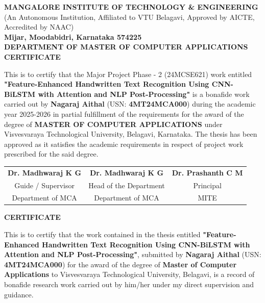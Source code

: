 \newpage

\begin{center}
    \textbf{MANGALORE INSTITUTE OF TECHNOLOGY \& ENGINEERING} \\
    {\small (An Autonomous Institution, Affiliated to VTU Belagavi, Approved by AICTE, Accredited by NAAC)} \\
    \textbf{Mijar, Moodabidri, Karnataka 574225} \\
    \vspace{0.5cm}
    \textbf{DEPARTMENT OF MASTER OF COMPUTER APPLICATIONS} \\
    \vspace{1.5cm}
    \Large{\textbf{CERTIFICATE}} \\
    \vspace{1.0cm}
\end{center}
This is to certify that the Major Project Phase - 2 (24MCSE621) work entitled \textbf{"Feature-Enhanced Handwritten Text Recognition Using CNN-BiLSTM with Attention and NLP Post-Processing"} is a bonafide work carried out by \textbf{Nagaraj Aithal} (USN: \textbf{4MT24MCA000}) during the academic year 2025-2026 in partial fulfillment of the requirements for the award of the degree of \textbf{MASTER OF COMPUTER APPLICATIONS} under Visvesvaraya Technological University, Belagavi, Karnataka. The thesis has been approved as it satisfies the academic requirements in respect of project work prescribed for the said degree.
\vspace{3cm}
\begin{table}[h!]
    \centering
    \begin{tabular}{ccc}
        \textbf{Dr. Madhwaraj K G} & \textbf{Dr. Madhwaraj K G} & \textbf{Dr. Prashanth C M} \\
        Guide / Supervisor & Head of the Department & Principal \\
        Department of MCA & Department of MCA & MITE \\
    \end{tabular}
\end{table}

\newpage

\begin{center}
    \Large{\textbf{CERTIFICATE}} \\
    \vspace{1.5cm}
\end{center}
This is to certify that the work contained in the thesis entitled \textbf{"Feature-Enhanced Handwritten Text Recognition Using CNN-BiLSTM with Attention and NLP Post-Processing"}, submitted by \textbf{Nagaraj Aithal} (USN: \textbf{4MT24MCA000}) for the award of the degree of \textbf{Master of Computer Applications} to Visvesvaraya Technological University, Belagavi, is a record of bonafide research work carried out by him/her under my direct supervision and guidance.

